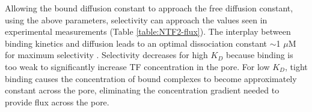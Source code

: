 Allowing the bound diffusion constant to approach the free diffusion constant, using the above parameters, selectivity can approach the values seen in experimental measurements (Table \ref{table:NTF2-flux}). The interplay between binding kinetics and diffusion leads to an optimal dissociation constant $\sim$1 $\mu$M for maximum selectivity . Selectivity decreases for high $K_D$ because binding is too weak to
significantly increase TF concentration in the pore.  For low $K_D$, tight binding causes the concentration of bound complexes to become approximately constant across the pore, eliminating the concentration gradient needed to provide flux across the pore.



